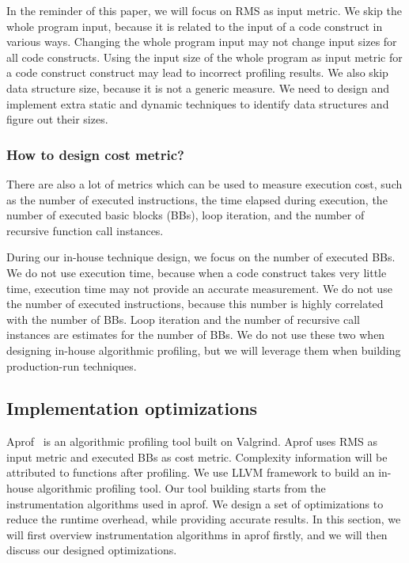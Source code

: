 In the reminder of this paper, we will focus on RMS as input metric. 
We skip the whole program input, 
because it is related to the input of a code construct in various ways.
Changing the whole program input may not change input sizes for 
all code constructs. 
Using the input size of the whole program as input metric for a code construct
construct may lead to incorrect profiling results. 
We also skip data structure size,
because it is not a generic measure. 
We need to design and implement extra static and dynamic techniques 
to identify data structures and figure out their sizes.

\subsubsection{How to design cost metric?}
There are also a lot of metrics which can be used to measure execution cost, 
such as the number of executed instructions, 
the time elapsed during execution,
the number of executed basic blocks (BBs), 
loop iteration, 
and the number of recursive function call instances.

During our in-house technique design, 
we focus on the number of executed BBs. 
We do not use execution time, 
because when a code construct takes very little time,
execution time may not provide an accurate measurement. 
We do not use the number of executed instructions, 
because this number is highly correlated with the number of BBs. 
Loop iteration and the number of recursive call instances are estimates 
for the number of BBs. 
We do not use these two when designing in-house algorithmic profiling, 
but we will leverage them when building production-run techniques.  

\subsection{Implementation optimizations}

Aprof~\cite{Aprof1, Aprof2} is an algorithmic profiling tool built on Valgrind. 
Aprof uses RMS as input metric and executed BBs as cost metric.
Complexity information will be attributed to functions after profiling. 
We use LLVM framework to build an in-house algorithmic profiling tool.
Our tool building starts from the instrumentation algorithms used in aprof. 
We design a set of optimizations to reduce the runtime overhead, 
while providing accurate results.
In this section, we will first overview instrumentation algorithms in aprof firstly, 
and we will then discuss our designed optimizations. 

